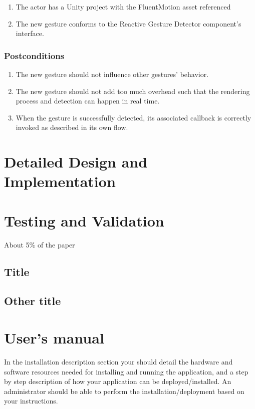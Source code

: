 \documentclass[12pt,a4paper,twoside]{report}
\begin{document}
\begin{enumerate}
  \item The actor has a Unity project with the FluentMotion asset referenced
  \item The new gesture conforms to the Reactive Gesture Detector component's interface.
\end{enumerate}

\subsection{Postconditions}

\begin{enumerate}
  \item The new gesture should not influence other gestures’ behavior.
  \item The new gesture should not add too much overhead such that the rendering process and detection can happen in real time.
  \item When the gesture is successfully detected, its associated callback is correctly invoked as described in its own flow.
\end{enumerate}

\chapter{Detailed Design and Implementation}

\chapter{Testing and Validation}

About 5\% of the paper
\section{Title}
\section{Other title}

\chapter{User's manual}

In the installation description section your should detail the hardware and software resources needed for installing and running the application, and a step by step description of how your application can be deployed/installed. An administrator should be able to perform the installation/deployment based on your instructions.
\end{document}
